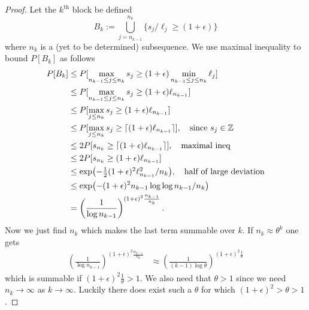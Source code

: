 \begin{proof}
Let the $k^\text{th}$ block be defined
\[
B_k:= \bigcup_{j=n_{k-1}}^{n_k} \{ s_{j}/\ell_{j} \geq  (1+\epsilon) \}
\]
  where $n_k$ is  a (yet to be determined) subsequence. We  use maximal inequality  to bound $P[B_k]$ as follows
\begin{align*}
P[B_k]  &\leq P[\max_{n_{k-1}\leq j\leq n_k} s_j \geq (1+\epsilon)\min_{n_{k-1}\leq j\leq n_k} \ell_{j}] \\
 &\leq P[\max_{n_{k-1}\leq j\leq n_k} s_j \geq (1+\epsilon) \ell_{n_{k-1}}] \\
 &\leq P[\max_{j\leq n_k} s_j \geq (1+\epsilon) \ell_{n_{k-1}}] \\
 &\leq P[\max_{j\leq n_k} s_j \geq \lceil(1+\epsilon) \ell_{n_{k-1}}\rceil],\quad\text{since $s_j\in\Bbb Z$} \\
 &\leq 2P[ s_{n_k} \geq \lceil(1+\epsilon) \ell_{n_{k-1}}\rceil],\quad\text{maximal ineq} \\
 &\leq 2P[ s_{n_k} \geq (1+\epsilon) \ell_{n_{k-1}}] \\
 &\leq \exp\bigl( - \textstyle\frac{1}{2}(1+\epsilon)^2 \ell^2_{n_{k-1}}/n_{k} \bigr),\quad\text{half of large deviation}\\
 &\leq \exp\bigl( - (1+\epsilon)^2 n_{k-1}\log\log n_{k-1}/n_{k} \bigr)\\
 & = \left(\frac{1}{\log n_{k-1}} \right)^{ (1+\epsilon)^2\frac{n_{k-1}}{n_{k}} }.
\end{align*}
Now we just find $n_k$ which makes the last term summable over $k$. If $n_k\approx \theta^k$ one gets
\begin{align*}
\left(\frac{1}{\log n_{k-1}} \right)^{ (1+\epsilon)^2\frac{n_{k-1}}{n_{k}} }
& \approx  \left(\frac{1}{(k-1)\log\theta} \right)^{ (1+\epsilon)^2\frac{1}{\theta} }
\end{align*}
which is summable if $(1+\epsilon)^2\frac{1}{\theta} >1$. We also need that   $\theta > 1$  since we need $n_k\rightarrow \infty$ as $k\rightarrow \infty$. Luckily there does exist such a $\theta$ for which $(1+\epsilon)^2> \theta > 1$.
\end{proof}

